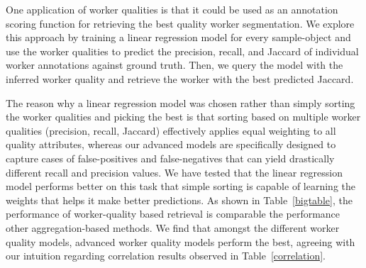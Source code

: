     One application of worker qualities is that it could be used as an annotation scoring function for retrieving the best quality worker segmentation. We explore this approach by training a linear regression model for every sample-object and use the worker qualities to predict the precision, recall, and Jaccard of individual worker annotations against ground truth. Then, we query the model with the inferred worker quality and retrieve the worker with the best predicted Jaccard. 
    \par The reason why a linear regression model was chosen rather than simply sorting the worker qualities and picking the best is that sorting based on multiple worker qualities (precision, recall, Jaccard) effectively applies equal weighting to all quality attributes, whereas our advanced models are specifically designed to capture cases of false-positives and false-negatives that can yield drastically different recall and precision values. We have tested that the linear regression model performs better on this task that simple sorting is capable of learning the weights that helps it make better predictions. As shown in Table~\ref{bigtable}, the performance of worker-quality based retrieval is comparable the performance other aggregation-based methods. We find that amongst the different worker quality models, advanced worker quality models perform the best, agreeing with our intuition regarding correlation results observed in Table~\ref{correlation}.
